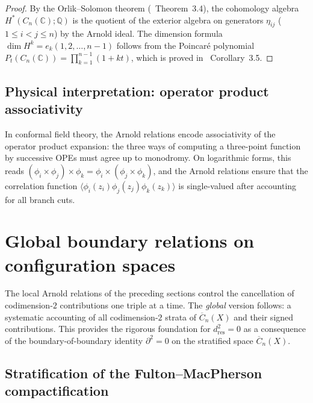 \begin{proof}
By the Orlik--Solomon theorem (\cite{OS80}~Theorem~3.4), the cohomology
algebra $H^*(C_n(\mathbb{C}); \mathbb{Q})$ is the quotient of the exterior
algebra on generators $\eta_{ij}$ ($1 \le i < j \le n$) by the Arnold
ideal.  The dimension formula
$\dim H^k = e_k(1, 2, \ldots, n-1)$ follows from the Poincar\'e
polynomial $P_t(C_n(\mathbb{C})) = \prod_{k=1}^{n-1}(1+kt)$, which
is proved in \cite{OS80}~Corollary~3.5.
\end{proof}

\subsection{Physical interpretation: operator product associativity}

\begin{remark}\label{persp:ope-arnold}
In conformal field theory, the Arnold relations encode associativity of the
operator product expansion: the three ways of computing a three-point function by
successive OPEs must agree up to monodromy.  On logarithmic forms, this reads
$(\phi_i \times \phi_j) \times \phi_k = \phi_i \times (\phi_j \times \phi_k)$,
and the Arnold relations ensure that the correlation function
$\langle \phi_i(z_i) \phi_j(z_j) \phi_k(z_k) \rangle$ is single-valued
after accounting for all branch cuts.
\end{remark}

\section{Global boundary relations on configuration spaces}
\label{sec:global-boundary-relations}

The local Arnold relations of the preceding sections control the cancellation of
codimension-$2$ contributions one triple at a time.  The
\emph{global} version follows: a systematic accounting of all codimension-$2$ strata
of $\overline{C}_n(X)$ and their signed contributions.  This provides the
rigorous foundation for $d_{\mathrm{res}}^2 = 0$ as a consequence of the
boundary-of-boundary identity $\partial^2 = 0$ on the stratified space
$\overline{C}_n(X)$.

\subsection{Stratification of the Fulton--MacPherson compactification}

